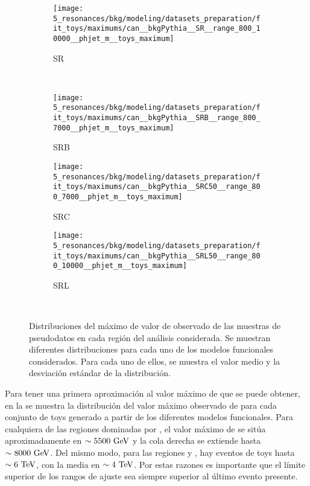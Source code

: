 \begin{figure}[ht!]
    \centering
    \begin{subfigure}[h]{0.32\linewidth}
        \centering
        \texttt{[image: 5\_resonances/bkg/modeling/datasets\_preparation/fit\_toys/maximums/can\_\_bkgPythia\_\_SR\_\_range\_800\_10000\_\_phjet\_m\_\_toys\_maximum]}
        \caption{SR}
    \end{subfigure}\\
    \begin{subfigure}[h]{0.32\linewidth}
        \centering
        \texttt{[image: 5\_resonances/bkg/modeling/datasets\_preparation/fit\_toys/maximums/can\_\_bkgPythia\_\_SRB\_\_range\_800\_7000\_\_phjet\_m\_\_toys\_maximum]}
        \caption{SRB}
    \end{subfigure}
    \begin{subfigure}[h]{0.32\linewidth}
        \centering
        \texttt{[image: 5\_resonances/bkg/modeling/datasets\_preparation/fit\_toys/maximums/can\_\_bkgPythia\_\_SRC50\_\_range\_800\_7000\_\_phjet\_m\_\_toys\_maximum]}
        \caption{SRC}
    \end{subfigure}
    \begin{subfigure}[h]{0.32\linewidth}
        \centering
        \texttt{[image: 5\_resonances/bkg/modeling/datasets\_preparation/fit\_toys/maximums/can\_\_bkgPythia\_\_SRL50\_\_range\_800\_10000\_\_phjet\_m\_\_toys\_maximum]}
        \caption{SRL}
    \end{subfigure}\\
    \caption{Distribuciones del máximo de valor de \myj observado de las muestras de pseudodatos en cada región del análisis considerada. Se muestran diferentes distribuciones para cada uno de los modelos funcionales considerados. Para cada uno de ellos, se muestra el valor medio y la desviación estándar de la distribución.}
    \label{fig:bkg:modeling:preparation:toys:toys_maximums}
\end{figure}

Para tener una primera aproximación al valor máximo de \myj que se puede obtener, en la \Fig{\ref{fig:bkg:modeling:preparation:toys:toys_maximums}} se muestra la distribución del valor máximo observado de \myj para cada conjunto de toys generado a partir de los diferentes modelos funcionales. Para cualquiera de las regiones dominadas por \ljets, el valor máximo de \myj se sitúa aproximadamente en \(\sim 5500~\text{GeV}\) y la cola derecha se extiende hasta \(\sim 8000~\text{GeV}\). Del mismo modo, para las regiones \cjets y \bjets, hay eventos de toys hasta \(\sim 6~\text{TeV}\), con la media en \(\sim 4~\text{TeV}\). Por estas razones es importante que el límite superior de los rangos de ajuste sea siempre superior al último evento presente.

























